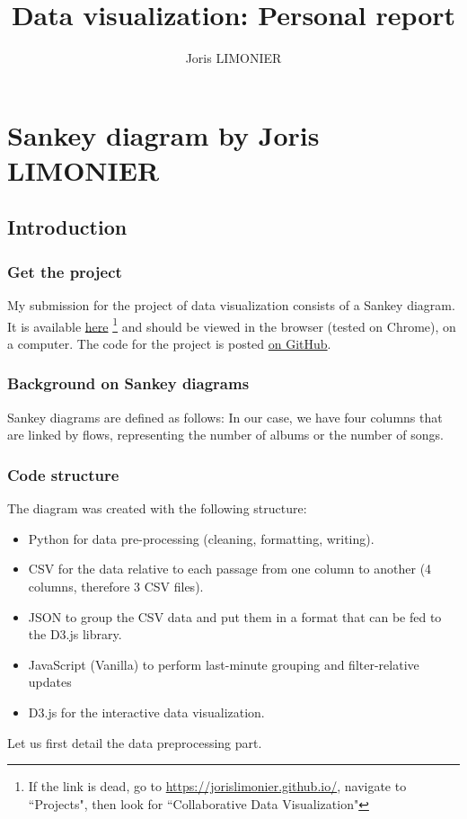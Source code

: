 \documentclass{article}
\title{Data visualization: Personal report}
\author{Joris LIMONIER}
\begin{document}
\maketitle

\tableofcontents
\newpage

\section{Sankey diagram by Joris LIMONIER}

\subsection{Introduction}
\subsubsection{Get the project}
My submission for the project of data visualization consists of a Sankey diagram. It is available \href{https://jorislimonier.github.io/projects/collab-data-vis/index.html}{here} \footnote{If the link is dead, go to \href{https://jorislimonier.github.io/}{https://jorislimonier.github.io/}, navigate to ``Projects", then look for ``Collaborative Data Visualization"} and should be viewed in the browser (tested on Chrome), on a computer. The code for the project is posted \href{https://github.com/jorislimonier/collab-viz/tree/main/joris}{on GitHub}.

\subsubsection{Background on Sankey diagrams}
Sankey diagrams are defined as follows:  \cite{noauthor_sankey_2021} In our case, we have four columns that are linked by flows, representing the number of albums or the number of songs.

\subsubsection{Code structure}
The diagram was created with the following structure:

\begin{itemize}
    \item Python \cite{van2000python} for data pre-processing (cleaning, formatting, writing).
    \item CSV for the data relative to each passage from one column to another (4 columns, therefore 3 CSV files).
    \item JSON to group the CSV data and put them in a format that can be fed to the D3.js library.
    \item JavaScript (Vanilla) to perform last-minute grouping and filter-relative updates
    \item D3.js \cite{bostock_d_2011} for the interactive data visualization.
\end{itemize}
Let us first detail the data preprocessing part.
\end{document}
